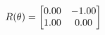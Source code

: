 \documentclass[preview]{standalone}
\begin{document}
\begin{align*}
\special{dvisvgm:raw <g id='unique000'>}R(\theta) = \begin{bmatrix}0.00 & -1.00\\1.00 & 0.00\end{bmatrix}\special{dvisvgm:raw </g>}
\end{align*}
\end{document}
